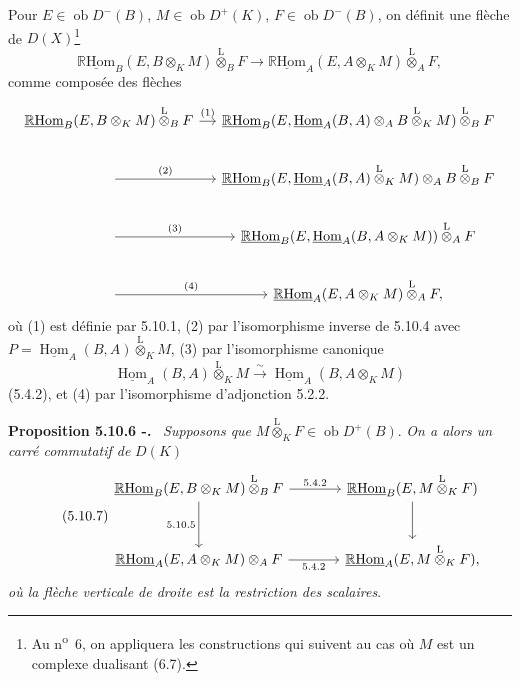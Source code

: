 \documentclass[11pt]{article}
\newenvironment{statement}[1]{\par\medskip\noindent\textbf{#1.}\ }{\par\medskip}
\DeclareMathOperator{\Hom}{Hom}
\newcommand{\R}{\mathbb{R}}\newcommand{\RHomCore}{\mathbb{R}\mathrm{Hom}}
\newcommand{\ob}{\operatorname{ob}}
\providecommand{\RHom}{\RHomCore}
\providecommand{\uRHom}{\underline{\RHom}}
\providecommand{\uHom}{\underline{\Hom}}
\providecommand{\lten}{\overset{\mathrm L}{\otimes}}
\providecommand{\RHom}{\RHomCore}
\providecommand{\Hom}{\operatorname{Hom}}
\providecommand{\ob}{\operatorname{ob}}
\providecommand{\lten}{\overset{\mathrm L}{\otimes}}
\providecommand{\RHom}{\R\mathcal{H}om}
\providecommand{\lten}{\overset{\mathrm L}{\otimes}}
\providecommand{\R}{\mathrm R}
\providecommand{\lten}{\overset{\mathrm L}{\otimes}}
\providecommand{\lten}{\overset{\mathrm L}{\otimes}}
\providecommand{\lten}{\overset{\mathrm L}{\otimes}}
\providecommand{\RHom}{\RHomCore}
\providecommand{\Hom}{\operatorname{Hom}}
\providecommand{\lten}{\overset{\mathrm L}{\otimes}}
\begin{document}
Pour $E\in\ob D^-(B)$, $M\in\ob D^+(K)$, $F\in\ob D^-(B)$, on définit une flèche de $D(X)$\footnote{Au n\textsuperscript{o}~6, on appliquera les constructions qui suivent au cas où $M$ est un complexe dualisant (6.7).}
\begin{equation}\tag{5.10.5}
\uRHom_B(E,B\otimes_KM)\lten_BF\longrightarrow\uRHom_A(E,A\otimes_KM)\lten_AF,
\end{equation}
comme composée des flèches
\[
\begin{tikzcd}[column sep=small]
\uRHom_B(E,B\otimes_KM)\lten_BF \arrow[r,"(1)"] & \uRHom_B(E,\uHom_A(B,A)\otimes_AB\lten_KM)\lten_BF \\
\arrow[r,"(2)"] & \uRHom_B(E,\uHom_A(B,A)\lten_KM)\otimes_A B\lten_BF \\
\arrow[r,"(3)"] & \uRHom_B(E,\uHom_A(B,A\otimes_KM))\lten_AF \\
\arrow[r,"(4)"] & \uRHom_A(E,A\otimes_KM)\lten_AF,
\end{tikzcd}
\]
où (1) est définie par 5.10.1, (2) par l'isomorphisme inverse de 5.10.4 avec $P=\uHom_A(B,A)\lten_KM$, (3) par l'isomorphisme canonique
\[
\uHom_A(B,A)\lten_KM\xrightarrow{\sim}\uHom_A(B,A\otimes_KM)
\]
(5.4.2), et (4) par l'isomorphisme d'adjonction 5.2.2.

\begin{statement}{Proposition 5.10.6 -}
\emph{Supposons que} $M\lten_KF\in\ob D^+(B)$. \emph{On a alors un carré commutatif de} $D(K)$
\begin{equation}\tag{5.10.7}
\begin{tikzcd}[column sep=large,row sep=large]
\uRHom_B(E,B\otimes_KM)\lten_BF \arrow[r,"5.4.2"] \arrow[d,"5.10.5"'] & \uRHom_B(E,M\lten_KF) \arrow[d]\\
\uRHom_A(E,A\otimes_KM)\otimes_AF \arrow[r,"5.4.2"'] & \uRHom_A(E,M\lten_KF),
\end{tikzcd}
\end{equation}
\emph{où la flèche verticale de droite est la restriction des scalaires}.
\end{statement}
\end{document}
